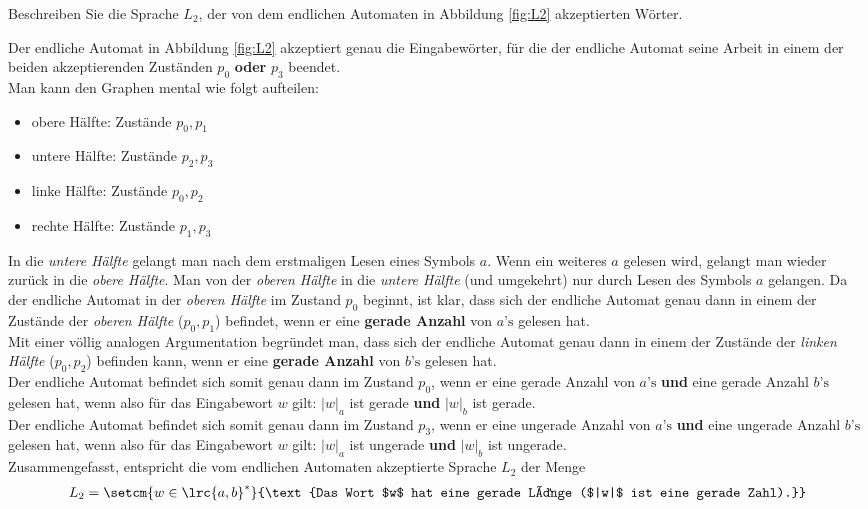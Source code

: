 \begin{myexercise}%
	\noindent
	Beschreiben Sie die Sprache $L_2$, der von dem endlichen Automaten in Abbildung \cref{fig:L2} akzeptierten Wörter.
\end{myexercise}
\begin{myanswer}
	\noindent
	Der endliche Automat in Abbildung \cref{fig:L2} akzeptiert genau die Eingabewörter, für die der endliche Automat seine Arbeit in einem der beiden akzeptierenden Zuständen $p_0$ \textbf{oder} $p_3$ beendet.\\
	Man kann den Graphen mental wie folgt aufteilen:
	\begin{itemize}
		\item obere Hälfte: Zustände $p_0, p_1$
		\item untere Hälfte: Zustände $p_2, p_3$
		\item linke Hälfte: Zustände $p_0, p_2$
		\item rechte Hälfte: Zustände $p_1, p_3$
	\end{itemize}
	In die \textit{untere Hälfte }gelangt man nach dem erstmaligen Lesen eines Symbols $a$. Wenn ein weiteres $a$ gelesen wird, gelangt man wieder zurück in die \textit{obere Hälfte}. Man von der \textit{oberen Hälfte} in die \textit{untere Hälfte} (und umgekehrt) nur durch Lesen des Symbols $a$ gelangen. Da der endliche Automat in der \textit{oberen Hälfte} im Zustand $p_0$ beginnt, ist klar, dass sich der endliche Automat genau dann in einem der Zustände der \textit{oberen Hälfte} ($p_0,p_1$) befindet, wenn er eine \textbf{gerade Anzahl} von $a\text{'s}$ gelesen hat.\\

	\noindent
	Mit einer völlig analogen Argumentation begründet man, dass sich der endliche Automat genau dann in einem der Zustände der \textit{linken Hälfte} ($p_0,p_2$) befinden kann, wenn er eine \textbf{gerade Anzahl} von $b\text{'s}$ gelesen hat.\\

	\noindent
	Der endliche Automat befindet sich somit genau dann im Zustand $p_0$, wenn er eine gerade Anzahl von $a\text{'s}$ \textbf{und} eine gerade Anzahl $b\text{'s}$ gelesen hat, wenn also für das Eingabewort $w$ gilt: $|w|_a$ ist gerade \textbf{und} $|w|_b$ ist gerade.\\

	\noindent
	Der endliche Automat befindet sich somit genau dann im Zustand $p_3$, wenn er eine ungerade Anzahl von $a\text{'s}$ \textbf{und} eine ungerade Anzahl $b\text{'s}$ gelesen hat, wenn also für das Eingabewort $w$ gilt: $|w|_a$ ist ungerade \textbf{und} $|w|_b$ ist ungerade.\\

	\noindent
	Zusammengefasst, entspricht die vom endlichen Automaten akzeptierte Sprache $L_2$ der Menge
	\begin{align*}
		L_2 = \setcm{w\in\lrc{a,b}^*}{\text{Das Wort $w$ hat eine gerade Länge ($|w|$ ist eine gerade Zahl).}}
	\end{align*}
\end{myanswer}

